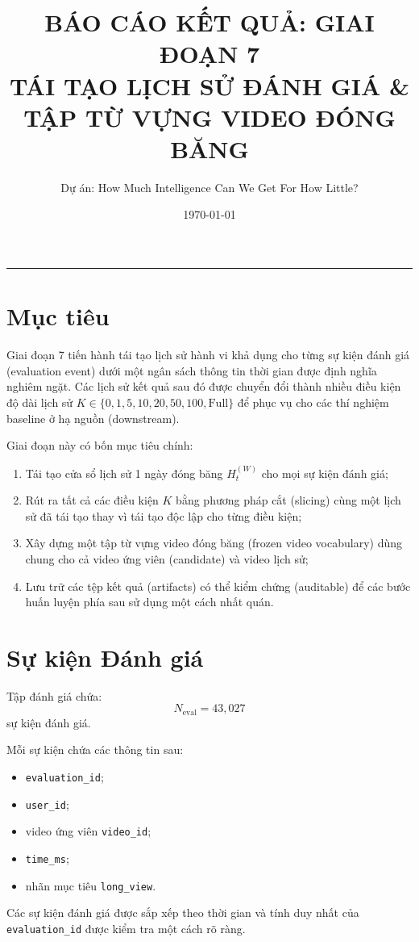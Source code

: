 \documentclass[12pt,a4paper]{article}
\title{\textbf{BÁO CÁO KẾT QUẢ: GIAI ĐOẠN 7 \\ TÁI TẠO LỊCH SỬ ĐÁNH GIÁ \& TẬP TỪ VỰNG VIDEO ĐÓNG BĂNG}}
\author{Dự án: How Much Intelligence Can We Get For How Little?}
\date{\today}
\begin{document}
\maketitle
\hrule
\vspace{15pt}

\section{Mục tiêu}
Giai đoạn 7 tiến hành tái tạo lịch sử hành vi khả dụng cho từng sự kiện đánh giá (evaluation event) dưới một ngân sách thông tin thời gian được định nghĩa nghiêm ngặt. Các lịch sử kết quả sau đó được chuyển đổi thành nhiều điều kiện độ dài lịch sử $K \in \{0, 1, 5, 10, 20, 50, 100, \mathrm{Full}\}$ để phục vụ cho các thí nghiệm baseline ở hạ nguồn (downstream).

Giai đoạn này có bốn mục tiêu chính:
\begin{enumerate}[noitemsep]
    \item Tái tạo cửa sổ lịch sử 1 ngày đóng băng $H_t^{(W)}$ cho mọi sự kiện đánh giá;
    \item Rút ra tất cả các điều kiện $K$ bằng phương pháp cắt (slicing) cùng một lịch sử đã tái tạo thay vì tái tạo độc lập cho từng điều kiện;
    \item Xây dựng một tập từ vựng video đóng băng (frozen video vocabulary) dùng chung cho cả video ứng viên (candidate) và video lịch sử;
    \item Lưu trữ các tệp kết quả (artifacts) có thể kiểm chứng (auditable) để các bước huấn luyện phía sau sử dụng một cách nhất quán.
\end{enumerate}

\section{Sự kiện Đánh giá}
Tập đánh giá chứa:
\[
N_{\mathrm{eval}} = 43{,}027
\]
sự kiện đánh giá.

Mỗi sự kiện chứa các thông tin sau:
\begin{itemize}[noitemsep]
    \item \texttt{evaluation\_id};
    \item \texttt{user\_id};
    \item video ứng viên \texttt{video\_id};
    \item \texttt{time\_ms};
    \item nhãn mục tiêu \texttt{long\_view}.
\end{itemize}
Các sự kiện đánh giá được sắp xếp theo thời gian và tính duy nhất của \texttt{evaluation\_id} được kiểm tra một cách rõ ràng.
\end{document}
